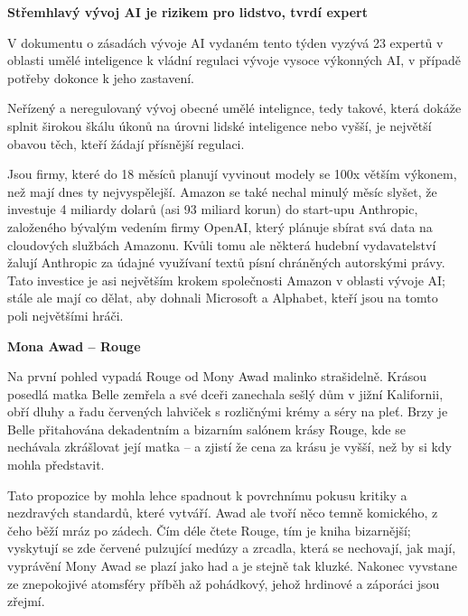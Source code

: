 \documentclass{article}
\title{\vspace{-2cm}\vspace{-1.7cm}}
\date{}
\author{}
\begin{document}
\maketitle
\textbf{Střemhlavý vývoj AI je rizikem pro lidstvo, tvrdí expert}

V dokumentu o zásadách vývoje AI vydaném tento týden vyzývá 23 expertů v oblasti umělé inteligence k vládní regulaci vývoje vysoce výkonných AI, v případě potřeby dokonce k jeho zastavení.


Neřízený a neregulovaný vývoj obecné umělé intelignce, tedy takové, která dokáže splnit širokou škálu úkonů na úrovni lidské inteligence nebo vyšší, je největší obavou těch, kteří žádají přísnější regulaci.

Jsou firmy, které do 18 měsíců planují vyvinout modely se 100x větším výkonem, než mají dnes ty nejvyspělejší. Amazon se také nechal minulý měsíc slyšet, že investuje 4 miliardy dolarů (asi 93 miliard korun) do start-upu Anthropic, založeného bývalým vedením firmy OpenAI, který plánuje sbírat svá data na cloudových službách Amazonu. Kvůli tomu ale některá hudební vydavatelství žalují Anthropic za údajné využívaní textů písní chráněných autorskými právy. Tato investice je asi největším krokem společnosti Amazon v oblasti vývoje AI; stále ale mají co dělat, aby dohnali Microsoft a Alphabet, kteří jsou na tomto poli největšími hráči.


\textbf{Mona Awad -- Rouge}

Na první pohled vypadá Rouge od Mony Awad malinko strašidelně. Krásou posedlá matka Belle zemřela a své dceři zanechala sešlý dům v jižní Kalifornii, obří dluhy a řadu červených lahviček s rozličnými krémy a séry na pleť. Brzy je Belle přitahována dekadentním a bizarním salónem krásy Rouge, kde se nechávala zkrášlovat její matka -- a zjistí že cena za krásu je vyšší, než by si kdy mohla představit.

Tato propozice by mohla lehce spadnout k povrchnímu pokusu kritiky  a nezdravých standardů, které vytváří. Awad ale tvoří něco temně komického, z čeho běží mráz po zádech. Čím déle čtete Rouge, tím je kniha bizarnější; vyskytují se zde červené pulzující medúzy a zrcadla, která se nechovají, jak mají, vyprávění Mony Awad se plazí jako had a je stejně tak kluzké. Nakonec vyvstane ze znepokojivé atomsféry příběh až pohádkový, jehož hrdinové a záporáci jsou zřejmí.
\end{document}
